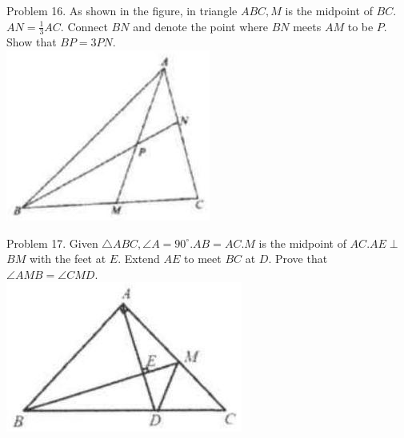 \documentclass[10pt]{article}
\begin{document}
Problem 16. As shown in the figure, in triangle \(A B C, M\) is the midpoint of \(B C\). \(A N=\frac{1}{3} A C\). Connect \(B N\) and denote the point where \(B N\) meets \(A M\) to be \(P\). Show that \(B P=3 P N\).\\
\includegraphics[max width=\textwidth, center]{2025_04_17_97bc1f7e44d93c271a88g-129(4)}

Problem 17. Given \(\triangle A B C, \angle A=90^{\circ} . A B=A C . M\) is the midpoint of \(A C . A E \perp\) \(B M\) with the feet at \(E\). Extend \(A E\) to meet \(B C\) at \(D\). Prove that \(\angle A M B=\angle C M D\).\\
\includegraphics[max width=\textwidth, center]{2025_04_17_97bc1f7e44d93c271a88g-129(3)}
\end{document}
